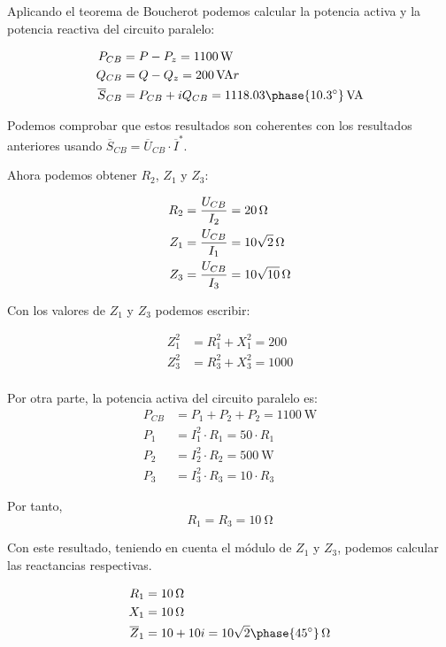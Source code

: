 \documentclass[12pt]{article}
\begin{document}
\begin{enumerate}
Aplicando el teorema de Boucherot podemos calcular la potencia activa
y la potencia reactiva del circuito paralelo:

\begin{align*}
P_{CB} &= P - P_z = \SI{1100}{\watt}\\
Q_{CB} &= Q - Q_z = \SI{200}{VA}r\\
\overline{S}_{CB} &= P_{CB} + i Q_{CB} = \SI[parse-numbers=false]{1118.03\phase{\ang{10.3}}}{VA}
\end{align*}

Podemos comprobar que estos resultados son coherentes con los
resultados anteriores usando $\overline{S}_{CB} = \overline{U}_{CB}
\cdot \overline{I}^*$.


Ahora podemos obtener $R_2$, $Z_1$ y $Z_3$:

\begin{align*}
  R_2 &= \frac{U_{CB}}{I_2} = \SI{20}{\ohm}\\
  Z_1 &= \frac{U_{CB}}{I_1} = \SI[parse-numbers=false]{10\sqrt{2}}{\ohm}\\
  Z_3 &= \frac{U_{CB}}{I_3} = \SI[parse-numbers=false]{10\sqrt{10}}{\ohm}
\end{align*}

Con los valores de $Z_1$ y $Z_3$ podemos escribir:

\begin{align*}
  Z_1^2 &= R_1^2 + X_1^2 = 200\\
  Z_3^2 &= R_3^2 + X_3^2 = 1000\\
\end{align*}

Por otra parte, la potencia activa del circuito paralelo es:
\begin{align*}
  P_{CB} &= P_1 + P_2 + P_2 =\SI{1100}{\watt}\\
  P_1 &= I_1^2 \cdot R_1 = 50 \cdot R_1\\
  P_2 &= I_2^2 \cdot R_2 = \SI{500}{\watt}\\
  P_3 &= I_3^2 \cdot R_3 = 10 \cdot R_3
\end{align*}

Por tanto, 
\[
   R_1 = R_3 = \SI{10}{\ohm}              
\]

Con este resultado, teniendo en cuenta el módulo de $Z_1$ y $Z_3$,
podemos calcular las reactancias respectivas.

\begin{align*}
  R_1 &= \SI{10}{\ohm}\\
  X_1 &= \SI{10}{\ohm}\\
  \overline{Z}_1 &= 10 + 10i = \SI[parse-numbers=false]{10\sqrt{2}\phase{\ang{45}}}{\ohm}
\end{align*}


\end{enumerate}
\end{document}
